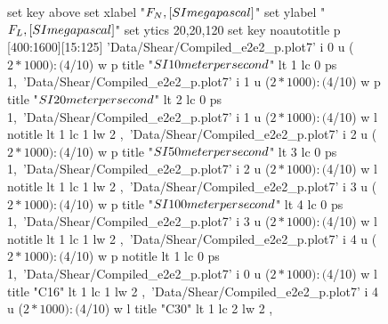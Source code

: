 \documentclass[aps,prb,reprint,superscriptaddress, a4paper]{revtex4-1}
\begin{document}
\begin{figure}
    	\begin{center}
		\begin{gnuplot}[terminal=pdf, terminaloptions={size \SERFigwidth cm, \SERFigheight cm color solid}]
			set key above
			set xlabel "$F_N \\, [\\SI{}{\\mega\\pascal}]$"
			set ylabel "$F_L \\, [\\SI{}{\\mega\\pascal}]$"
			set ytics 20,20,120
			set key noautotitle
p [400:1600][15:125]	'Data/Shear/Compiled_e2e2_p.plot7' i 0 u ($2*1000):($4/10) w p title "$\\SI{10}{\\meter\\per\\second}$" lt 1 lc 0 ps 1,\
                'Data/Shear/Compiled_e2e2_p.plot7' i 1 u ($2*1000):($4/10) w p title "$\\SI{20}{\\meter\\per\\second}$" lt 2 lc 0 ps 1,\
	    		'Data/Shear/Compiled_e2e2_p.plot7' i 1 u ($2*1000):($4/10) w l notitle  lt 1 lc 1 lw 2	,\
                'Data/Shear/Compiled_e2e2_p.plot7' i 2 u ($2*1000):($4/10) w p title "$\\SI{50}{\\meter\\per\\second}$" lt 3 lc 0 ps 1,\
	    		'Data/Shear/Compiled_e2e2_p.plot7' i 2 u ($2*1000):($4/10) w l notitle  lt 1 lc 1 lw 2	,\
                'Data/Shear/Compiled_e2e2_p.plot7' i 3 u ($2*1000):($4/10) w p title "$\\SI{100}{\\meter\\per\\second}$" lt 4 lc 0 ps 1,\
	    		'Data/Shear/Compiled_e2e2_p.plot7' i 3 u ($2*1000):($4/10) w l notitle  lt 1 lc 1 lw 2 ,\
                'Data/Shear/Compiled_e2e2_p.plot7' i 4 u ($2*1000):($4/10) w p notitle  lt 1 lc 0 ps 1,\
	    		'Data/Shear/Compiled_e2e2_p.plot7' i 0 u ($2*1000):($4/10) w l title "C16" lt 1 lc 1 lw 2 ,\
	    		'Data/Shear/Compiled_e2e2_p.plot7' i 4 u ($2*1000):($4/10) w l title "C30" lt 1 lc 2 lw 2 ,\	    		

\end{gnuplot}
\end{center}
\end{figure}
\end{document}

